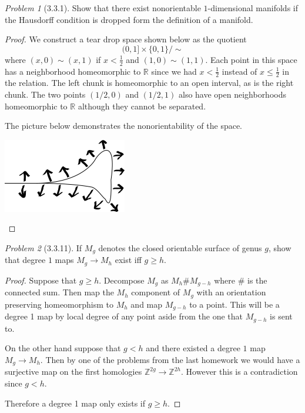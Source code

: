 \documentclass[10pt]{article}
\newcommand{\sk}{\vskip 10mm}
\newcommand{\bb}[1]{\mathbb{#1}}
\theoremstyle{remark}
\newtheorem{problem}{Problem}
\begin{document}
\begin{problem}[3.3.1]
  Show that there exist nonorientable $1$-dimensional manifolds if the Hausdorff
  condition is dropped form the definition of a manifold.
\end{problem}

\begin{proof}
  We construct a tear drop space shown below as the quotient
  \[
    (0,1] \times\{0,1\}/\sim
  \]
  where $(x,0)\sim(x,1)$ if $x<\frac{1}{2}$ and $(1,0)\sim (1,1)$. Each
  point in this space has a neighborhood homeomorphic to $\bb{R}$ since
  we had $x<\frac{1}{2}$ instead of $x\leq\frac{1}{2}$ in the relation.
  The left chunk is homeomorphic to an open interval, as is the right chunk.
  The two points $(1/2,0)$ and $(1/2,1)$ also have open neighborhoods
  homeomorphic to $\bb{R}$ although they cannot be separated.

  The picture below demonstrates the nonorientability of the space.
  \begin{center}
    \includegraphics{tears}  
  \end{center}
\end{proof}

\sk

\begin{problem}[3.3.11]
  If $M_g$ denotes the closed orientable surface of genus $g$, show
  that degree $1$ maps $M_g\rightarrow M_h$ exist iff $g\geq h$.
\end{problem}

\begin{proof}
  Suppose that $g\geq h$. Decompose $M_g$ as $M_h\#M_{g-h}$ where
  $\#$ is the connected sum. Then map the $M_h$ component of $M_g$
  with an orientation preserving homeomorphism to $M_h$ and map
  $M_{g-h}$ to a point. This will be a degree 1 map by local degree
  of any point aside from the one that $M_{g-h}$ is sent to.

  On the other hand suppose that $g< h$ and there existed
  a degree $1$ map $M_g\rightarrow M_h$. Then by one of the problems
  from the last homework we would have a surjective map on the
  first homologies $\bb{Z}^{2g}\rightarrow \bb{Z}^{2h}$. However this is a
  contradiction since $g<h$.

  Therefore a degree 1 map only exists if $g\geq h$.
\end{proof}
\end{document}
